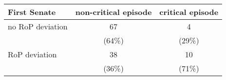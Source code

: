 \begin{table}[ht]
\centering
\begin{tabular}{l|cc}
  \hline
First Senate & non-critical episode & critical episode \\ 
  \hline
no RoP deviation & 67 & 4 \\ 
   & (64\%) & (29\%) \\ 
  RoP deviation & 38 & 10 \\ 
   & (36\%) & (71\%) \\ 
   \hline
\end{tabular}
\end{table}
